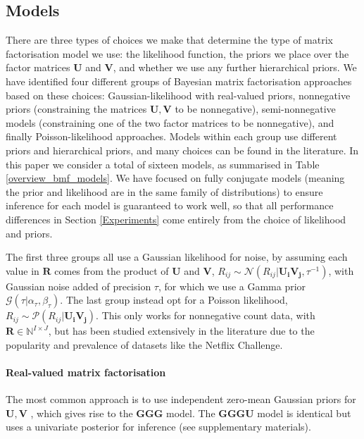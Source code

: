 \documentclass[letterpaper]{article} %
\newcommand{\R}{\boldsymbol R}
\newcommand{\U}{\boldsymbol U}
\newcommand{\Ui}{\boldsymbol{U_i}}
\newcommand{\V}{\boldsymbol V}
\newcommand{\Vj}{\boldsymbol{V_j}}
\begin{document}
	\subsection{Models} \label{Models}
		There are three types of choices we make that determine the type of matrix factorisation model we use: the likelihood function, the priors we place over the factor matrices $\U$ and $\V$, and whether we use any further hierarchical priors. 
		We have identified four different groups of Bayesian matrix factorisation approaches based on these choices: Gaussian-likelihood with real-valued priors, nonnegative priors (constraining the matrices $\U, \V$ to be nonnegative), semi-nonnegative models (constraining one of the two factor matrices to be nonnegative), and finally Poisson-likelihood approaches. 
		Models within each group use different priors and hierarchical priors, and many choices can be found in the literature. In this paper we consider a total of sixteen models, as summarised in Table \ref{overview_bmf_models}. We have focused on fully conjugate models (meaning the prior and likelihood are in the same family of distributions) to ensure inference for each model is guaranteed to work well, so that all performance differences in Section \ref{Experiments} come entirely from the choice of likelihood and priors.
		
		The first three groups all use a Gaussian likelihood for noise, by assuming each value in $\R$ comes from the product of $\U$ and $\V$, $R_{ij} \sim \mathcal{N} (R_{ij} | \Ui \Vj, \tau^{-1} )$, with Gaussian noise added of precision $\tau$, for which we use a Gamma prior $\mathcal{G} (\tau | \alpha_{\tau}, \beta_{\tau} )$. 
		The last group instead opt for a Poisson likelihood, $ R_{ij} \sim \mathcal{P} (R_{ij} | \Ui \Vj )$. This only works for nonnegative count data, with $ \R \in \mathbb{N}^{I \times J} $, but has been studied extensively in the literature due to the popularity and prevalence of datasets like the Netflix Challenge. 
		
		\paragraph{Real-valued matrix factorisation}
			The most common approach is to use independent zero-mean Gaussian priors for $\U, \V$ \cite{Salakhutdinov2008,Gonen2012,Virtanen2011,Virtanen2012}, which gives rise to the \textbf{GGG} model. The \textbf{GGGU} model is identical but uses a univariate posterior for inference (see supplementary materials).
			
\end{document}
